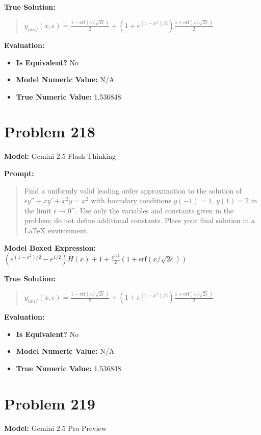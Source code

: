 \documentclass{article}
\begin{document}
{\textbf{True Solution:}
\begin{quote}
$y_{unif}(x, \epsilon) = \frac{1-\text{erf}(x/\sqrt{2\epsilon})}{2} + \left(1 + e^{(1-x^2)/2}\right) \frac{1+\text{erf}(x/\sqrt{2\epsilon})}{2}$
\end{quote}

\textbf{Evaluation:}
\begin{itemize}
\item \textbf{Is Equivalent?} No
\item \textbf{Model Numeric Value:} N/A
\item \textbf{True Numeric Value:} 1.536848
\end{itemize}
\vspace{1cm}
\section*{Problem 218}
\textbf{Model:} Gemini 2.5 Flash Thinking

\textbf{Prompt:}
\begin{quote}
Find a uniformly valid leading order approximation to the solution of $\epsilon y'' + x y' + x^2 y = x^2$ with boundary conditions $y(-1) = 1$, $y(1) = 2$ in the limit $\epsilon \to 0^+$. Use only the variables and constants given in the problem; do not define additional constants. Place your final solution in a $\boxed{}$ LaTeX environment.
\end{quote}
\textbf{Model Boxed Expression:} $ (e^{(1-x^2)/2} - e^{1/2})H(x) + 1 + \frac{e^{1/2}}{2}(1+\mathrm{erf}(x/\sqrt{2\epsilon})) $

\textbf{True Solution:}
\begin{quote}
$y_{unif}(x, \epsilon) = \frac{1-\text{erf}(x/\sqrt{2\epsilon})}{2} + \left(1 + e^{(1-x^2)/2}\right) \frac{1+\text{erf}(x/\sqrt{2\epsilon})}{2}$
\end{quote}

\textbf{Evaluation:}
\begin{itemize}
\item \textbf{Is Equivalent?} No
\item \textbf{Model Numeric Value:} N/A
\item \textbf{True Numeric Value:} 1.536848
\end{itemize}
\vspace{1cm}
\section*{Problem 219}
\textbf{Model:} Gemini 2.5 Pro Preview

}
\end{document}
